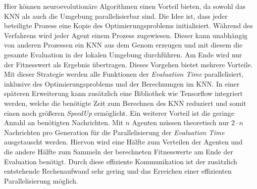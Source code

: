 Hier können neuroevolutionäre Algorithmen einen Vorteil bieten, da sowohl das \ac{KNN} als auch die Umgebung parallelisierbar sind. Die Idee ist, dass jeder beteiligte Prozess eine Kopie des Optimierungsproblems initialisiert. Während des Verfahrens wird jeder Agent einem Prozess zugewiesen. Dieser kann unabhängig von anderen Prozessen ein \ac{KNN} aus dem Genom erzeugen und mit diesem die gesamte Evaluation in der lokalen Umgebung durchführen. Am Ende wird nur der Fitnesswert als Ergebnis übertragen. Dieses Vorgehen bietet mehrere Vorteile. Mit dieser Strategie werden alle Funktionen der \emph{Evaluation Time} parallelisiert, inklusive des Optimierungsproblems und der Berechnungen im \ac{KNN}. In einer späteren Erweiterung kann zusätzlich eine Bibliothek wie Tensorflow integriert werden, welche die benötigte Zeit zum Berechnen des \ac{KNN} reduziert und somit einen noch größeren \emph{SpeedUp} ermöglicht. Ein weiterer Vorteil ist die geringe Anzahl an benötigten Nachrichten. Mit $n$ Agenten müssen theoretisch nur $2 \cdot n$ Nachrichten pro Generation für die Parallelisierung der \emph{Evaluation Time} ausgetauscht werden. Hiervon wird eine Hälfte zum Verteilen der Agenten und die andere Hälfte zum Sammeln der berechneten Fitnesswerte am Ende der Evaluation benötigt. Durch diese effiziente Kommunikation ist der zusätzlich entstehende Rechenaufwand sehr gering und das Erreichen einer effizienten Parallelisierung möglich.

 



